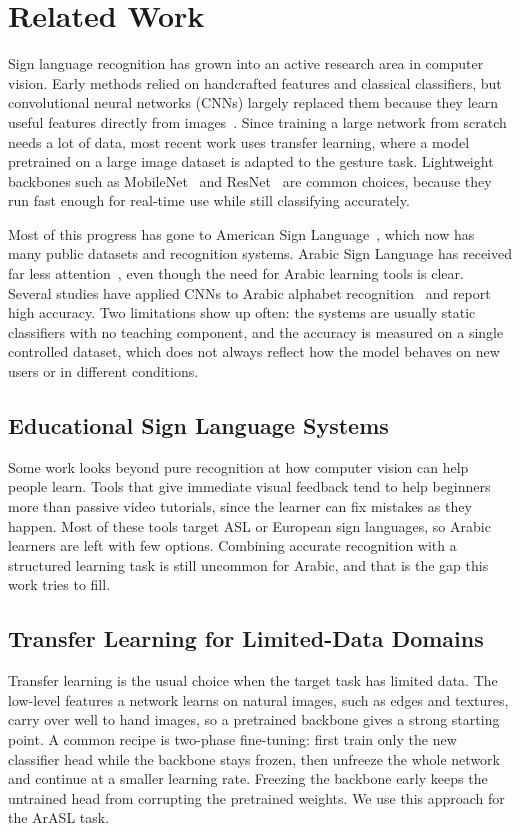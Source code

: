 \section{Related Work}

Sign language recognition has grown into an active research area in computer
vision. Early methods relied on handcrafted features and classical classifiers, but
convolutional neural networks (CNNs) largely replaced them because they learn
useful features directly from images~\cite{krizhevsky2012, he2016}. Since training a
large network from scratch needs a lot of data, most recent work uses transfer
learning, where a model pretrained on a large image dataset is adapted to the
gesture task. Lightweight backbones such as MobileNet~\cite{sandler2018mobilenetv2}
and ResNet~\cite{he2016} are common choices, because they run fast enough for
real-time use while still classifying accurately.

Most of this progress has gone to American Sign Language~\cite{rastgoo2021survey},
which now has many public datasets and recognition systems. Arabic Sign Language has
received far less attention~\cite{mohandes2014}, even though the need for Arabic
learning tools is clear. Several studies have applied CNNs to Arabic alphabet
recognition~\cite{latif2020arsl, mohandes2014} and report high accuracy. Two
limitations show up often: the systems are usually static classifiers with no
teaching component, and the accuracy is measured on a single controlled dataset,
which does not always reflect how the model behaves on new users or in different
conditions.

\subsection{Educational Sign Language Systems}
Some work looks beyond pure recognition at how computer vision can help people
learn. Tools that give immediate visual feedback tend to help beginners more than
passive video tutorials, since the learner can fix mistakes as they happen. Most of
these tools target ASL or European sign languages, so Arabic learners are left with
few options. Combining accurate recognition with a structured learning task is
still uncommon for Arabic, and that is the gap this work tries to fill.

\subsection{Transfer Learning for Limited-Data Domains}
Transfer learning is the usual choice when the target task has limited data. The
low-level features a network learns on natural images, such as edges and textures,
carry over well to hand images, so a pretrained backbone gives a strong starting
point. A common recipe is two-phase fine-tuning: first train only the new classifier
head while the backbone stays frozen, then unfreeze the whole network and continue
at a smaller learning rate. Freezing the backbone early keeps the untrained head
from corrupting the pretrained weights. We use this approach for the ArASL task.
